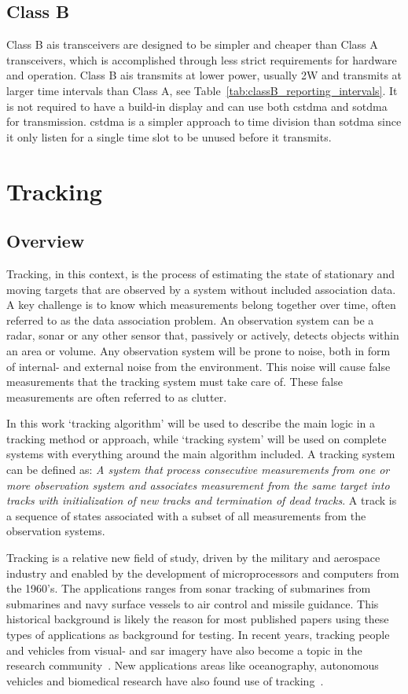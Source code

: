 \subsection{Class B}
Class B \gls{ais} transceivers are designed to be simpler and cheaper than Class A transceivers, which is accomplished through less strict requirements for hardware and operation. Class B \gls{ais} transmits at lower power, usually 2W and transmits at larger time intervals than Class A, see Table~\ref{tab:classB_reporting_intervals}. It is not required to have a build-in display and can use both \gls{cstdma} and \gls{sotdma} for transmission. \gls{cstdma} is a simpler approach to time division than \gls{sotdma} since it only listen for a single time slot to be unused before it transmits.

\section{Tracking}
\subsection{Overview}
Tracking, in this context, is the process of estimating the state of stationary and moving targets that are observed by a system without included association data. A key challenge is to know which measurements belong together over time, often referred to as the data association problem. An observation system can be a radar, sonar or any other sensor that, passively or actively, detects objects within an area or volume. Any observation system will be prone to noise, both in form of internal- and external noise from the environment. This noise will cause false measurements that the tracking system must take care of. These false measurements are often referred to as clutter.

In this work `tracking algorithm' will be used to describe the main logic in a tracking method or approach, while `tracking system' will be used on complete systems with everything around the main algorithm included. A tracking system can be defined as: \emph{A system that process consecutive measurements from one or more observation system and associates measurement from the same target into tracks with initialization of new tracks and termination of dead tracks}. A track is a sequence of states associated with a subset of all measurements from the observation systems. 

Tracking is a relative new field of study, driven by the military and aerospace industry and enabled by the development of microprocessors and computers from the 1960's. The applications ranges from sonar tracking of submarines from submarines and navy surface vessels to air control and missile guidance. This historical background is likely the reason for most published papers using these types of applications as background for testing. In recent years, tracking people and vehicles from visual- and \gls{sar} imagery have also become a topic in the research community~\cite{Carthel2007,Carthel2007a,Coraluppi2000}. New applications areas like oceanography, autonomous vehicles and biomedical research have also found use of tracking~\cite{Wolf2010,Svec2014,Vo2015}.

